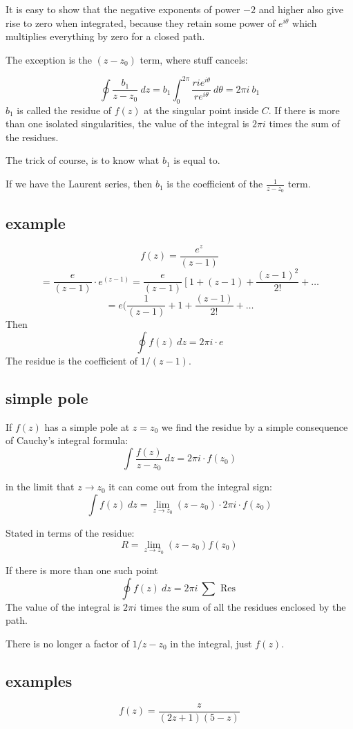 \documentclass[11pt, oneside]{article}
\begin{document}
It is easy to show that the negative exponents of power $-2$ and higher also give rise to zero when integrated, because they retain some power of $e^{i \theta}$ which multiplies everything by zero for a closed path.

The exception is the $(z-z_0)$ term, where stuff cancels:

\[ \oint \frac{b_1}{z - z_0} \ dz = b_1 \int_0^{2 \pi} \frac{ri e^{i \theta}}{r e^{i \theta}} \ d \theta = 2 \pi i \ b_1 \]
$b_1$ is called the residue of $f(z)$ at the singular point inside $C$.  If there is more than one isolated singularities, the value of the integral is $2 \pi i$ times the sum of the residues.

The trick of course, is to know what $b_1$ is equal to.

If we have the Laurent series, then $b_1$ is the coefficient of the $\frac{1}{z - z_0}$ term.

\subsection*{example}

\[ f(z) = \frac{e^z}{(z - 1)} \]
\[ = \frac{e}{(z - 1)} \cdot e^{(z - 1)} = \frac{e}{(z - 1)} \ [ \ 1 + (z - 1) + \frac{(z-1)^2}{2!} + \dots \]
\[ = e(\frac{1}{(z - 1)} + 1 + \frac{(z-1)}{2!} + \dots \]
Then
\[ \oint f(z) \ dz = 2 \pi i \cdot e \]
The residue is the coefficient of $1/(z-1)$.

\subsection*{simple pole}
If $f(z)$ has a simple pole at $z = z_0$ we find the residue by a simple consequence of Cauchy's integral formula:
\[ \int \frac{f(z)}{z - z_0} \ dz = 2 \pi i \cdot f(z_0) \]

in the limit that $z \rightarrow z_0$ it can come out from the integral sign:
\[ \int f(z) \ dz = \lim_{z \rightarrow z_0} (z - z_0) \cdot 2 \pi i \cdot f(z_0) \]

Stated in terms of the residue: 
\[ R = \lim_{z \rightarrow z_0} (z - z_0) f(z_0) \]

If there is more than one such point
\[ \oint f(z) \ dz = 2 \pi i \ \sum \text{ Res } \]
The value of the integral is $2 \pi i$ times the sum of all the residues enclosed by the path.

There is no longer a factor of $1/z-z_0$ in the integral, just $f(z)$.

\subsection*{examples}
\[ f(z) = \frac{z}{(2z + 1)(5 - z)} \]
\end{document}
